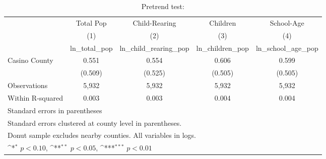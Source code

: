 \begin{table}[htbp]\centering
\def\sym#1{\ifmmode^{#1}\else\(^{#1}\)\fi}
\caption{Pretrend test:}
\begin{tabular}{l*{4}{c}}
\hline\hline
            &\multicolumn{1}{c}{Total Pop}&\multicolumn{1}{c}{Child-Rearing}&\multicolumn{1}{c}{Children}&\multicolumn{1}{c}{School-Age}\\\cmidrule(lr){2-2}\cmidrule(lr){3-3}\cmidrule(lr){4-4}\cmidrule(lr){5-5}
            &\multicolumn{1}{c}{(1)}&\multicolumn{1}{c}{(2)}&\multicolumn{1}{c}{(3)}&\multicolumn{1}{c}{(4)}\\
            &\multicolumn{1}{c}{ln\_total\_pop}&\multicolumn{1}{c}{ln\_child\_rearing\_pop}&\multicolumn{1}{c}{ln\_children\_pop}&\multicolumn{1}{c}{ln\_school\_age\_pop}\\
\hline
Casino County&       0.551         &       0.554         &       0.606         &       0.599         \\
            &     (0.509)         &     (0.525)         &     (0.505)         &     (0.505)         \\
\hline
Observations&       5,932         &       5,932         &       5,932         &       5,932         \\
Within R-squared&       0.003         &       0.003         &       0.004         &       0.004         \\
\hline\hline
\multicolumn{5}{l}{\footnotesize Standard errors in parentheses}\\
\multicolumn{5}{l}{\footnotesize Standard errors clustered at county level in parentheses.}\\
\multicolumn{5}{l}{\footnotesize Donut sample excludes nearby counties. All variables in logs.}\\
\multicolumn{5}{l}{\footnotesize \sym{*} \(p<0.10\), \sym{**} \(p<0.05\), \sym{***} \(p<0.01\)}\\
\end{tabular}
\end{table}
